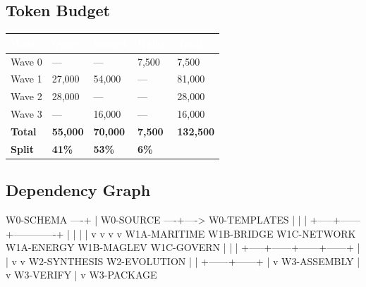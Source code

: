 \documentclass[11pt,letterpaper]{article}
\newcommand{\tableheader}[1]{\textbf{\sffamily\textcolor{white}{#1}}}
\begin{document}
\subsection{Token Budget}

\begin{center}
\begin{tabularx}{\textwidth}{L{3cm}C{2cm}C{2cm}C{2cm}C{2cm}}
\toprule
{}
\tableheader{Wave} & \tableheader{Opus} & \tableheader{Sonnet} & \tableheader{Haiku} & \tableheader{Total} \\
\midrule
Wave 0 & --- & --- & 7,500 & 7,500 \\
Wave 1 & 27,000 & 54,000 & --- & 81,000 \\
Wave 2 & 28,000 & --- & --- & 28,000 \\
Wave 3 & --- & 16,000 & --- & 16,000 \\
\midrule
\textbf{Total} & \textbf{55,000} & \textbf{70,000} & \textbf{7,500} & \textbf{132,500} \\
\textbf{Split} & \textbf{41\%} & \textbf{53\%} & \textbf{6\%} & \\
\bottomrule
\end{tabularx}
\end{center}

\subsection{Dependency Graph}

\begin{asciibox}
  W0-SCHEMA ----+
                |
  W0-SOURCE ----+----> W0-TEMPLATES
                |           |
                |     +-----+------+-------------+
                |     |            |             |
                v     v            v             v
           W1A-MARITIME    W1B-BRIDGE     W1C-NETWORK
           W1A-ENERGY      W1B-MAGLEV     W1C-GOVERN
                |            |             |
                +-----+------+------+------+
                      |             |
                      v             v
                 W2-SYNTHESIS  W2-EVOLUTION
                      |             |
                      +------+------+
                             |
                             v
                        W3-ASSEMBLY
                             |
                             v
                         W3-VERIFY
                             |
                             v
                        W3-PACKAGE
\end{asciibox}
\end{document}
